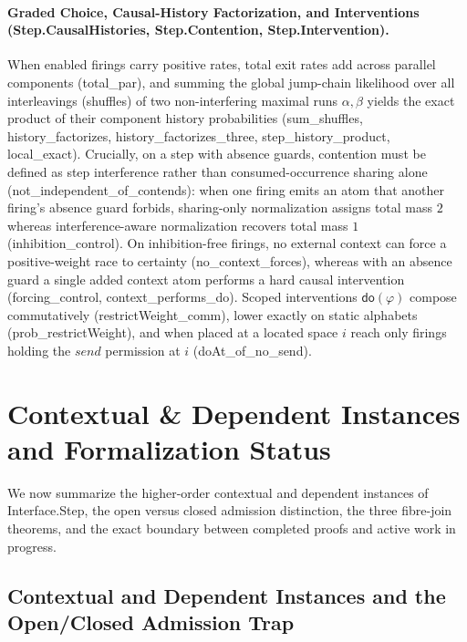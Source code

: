 \documentclass[11pt,a4paper]{article}
\theoremstyle{definition}
\DeclareRobustCommand{\lean}[1]{%
  \ifmmode\text{\normalfont\ttfamily\footnotesize\detokenize{#1}}%
  \else{\normalfont\footnotesize\leanurl{#1}}\fi}
\def\lean#1{#1}%
\begin{document}
\paragraph{Graded Choice, Causal-History Factorization, and Interventions (\lean{Step.CausalHistories}, \lean{Step.Contention}, \lean{Step.Intervention}).}
When enabled firings carry positive rates, total exit rates add across parallel components (\lean{total_par}), and summing the global jump-chain likelihood over all interleavings (\lean{shuffles}) of two non-interfering maximal runs $\alpha, \beta$ yields the exact product of their component history probabilities (\lean{sum_shuffles}, \lean{history_factorizes}, \lean{history_factorizes_three}, \lean{step_history_product}, \lean{local_exact}). Crucially, on a step with absence guards, contention must be defined as step interference rather than consumed-occurrence sharing alone (\lean{not_independent_of_contends}): when one firing emits an atom that another firing's absence guard forbids, sharing-only normalization assigns total mass $2$ whereas interference-aware normalization recovers total mass $1$ (\lean{inhibition_control}). On inhibition-free firings, no external context can force a positive-weight race to certainty (\lean{no_context_forces}), whereas with an absence guard a single added context atom performs a hard causal intervention (\lean{forcing_control}, \lean{context_performs_do}). Scoped interventions $\mathsf{do}(\varphi)$ compose commutatively (\lean{restrictWeight_comm}), lower exactly on static alphabets (\lean{prob_restrictWeight}), and when placed at a located space $i$ reach only firings holding the $\lean{send}$ permission at $i$ (\lean{doAt_of_no_send}).

\section{Contextual \& Dependent Instances and Formalization Status}
\label{sec:dependent}

We now summarize the higher-order contextual and dependent instances of \lean{Interface.Step}, the open versus closed admission distinction, the three fibre-join theorems, and the exact boundary between completed proofs and active work in progress.

\subsection{Contextual and Dependent Instances and the Open/Closed Admission Trap}
\end{document}
